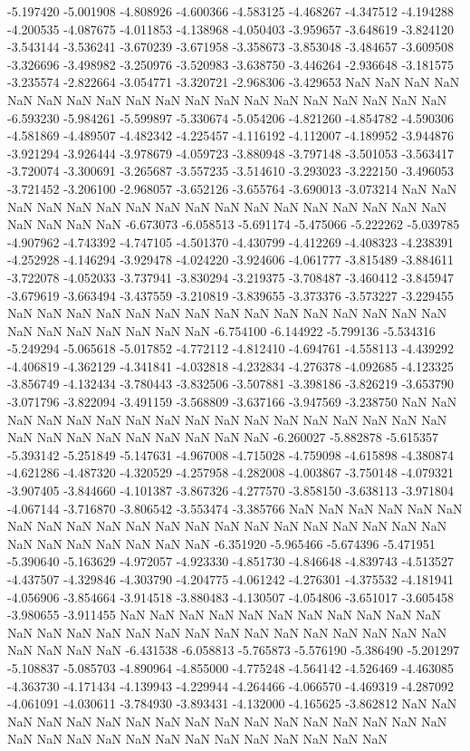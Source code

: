 -5.197420
-5.001908
-4.808926
-4.600366
-4.583125
-4.468267
-4.347512
-4.194288
-4.200535
-4.087675
-4.011853
-4.138968
-4.050403
-3.959657
-3.648619
-3.824120
-3.543144
-3.536241
-3.670239
-3.671958
-3.358673
-3.853048
-3.484657
-3.609508
-3.326696
-3.498982
-3.250976
-3.520983
-3.638750
-3.446264
-2.936648
-3.181575
-3.235574
-2.822664
-3.054771
-3.320721
-2.968306
-3.429653
NaN
NaN
NaN
NaN
NaN
NaN
NaN
NaN
NaN
NaN
NaN
NaN
NaN
NaN
NaN
NaN
NaN
NaN
NaN
-6.593230
-5.984261
-5.599897
-5.330674
-5.054206
-4.821260
-4.854782
-4.590306
-4.581869
-4.489507
-4.482342
-4.225457
-4.116192
-4.112007
-4.189952
-3.944876
-3.921294
-3.926444
-3.978679
-4.059723
-3.880948
-3.797148
-3.501053
-3.563417
-3.720074
-3.300691
-3.265687
-3.557235
-3.514610
-3.293023
-3.222150
-3.496053
-3.721452
-3.206100
-2.968057
-3.652126
-3.655764
-3.690013
-3.073214
NaN
NaN
NaN
NaN
NaN
NaN
NaN
NaN
NaN
NaN
NaN
NaN
NaN
NaN
NaN
NaN
NaN
NaN
NaN
NaN
NaN
-6.673073
-6.058513
-5.691174
-5.475066
-5.222262
-5.039785
-4.907962
-4.743392
-4.747105
-4.501370
-4.430799
-4.412269
-4.408323
-4.238391
-4.252928
-4.146294
-3.929478
-4.024220
-3.924606
-4.061777
-3.815489
-3.884611
-3.722078
-4.052033
-3.737941
-3.830294
-3.219375
-3.708487
-3.460412
-3.845947
-3.679619
-3.663494
-3.437559
-3.210819
-3.839655
-3.373376
-3.573227
-3.229455
NaN
NaN
NaN
NaN
NaN
NaN
NaN
NaN
NaN
NaN
NaN
NaN
NaN
NaN
NaN
NaN
NaN
NaN
NaN
NaN
NaN
NaN
-6.754100
-6.144922
-5.799136
-5.534316
-5.249294
-5.065618
-5.017852
-4.772112
-4.812410
-4.694761
-4.558113
-4.439292
-4.406819
-4.362129
-4.341841
-4.032818
-4.232834
-4.276378
-4.092685
-4.123325
-3.856749
-4.132434
-3.780443
-3.832506
-3.507881
-3.398186
-3.826219
-3.653790
-3.071796
-3.822094
-3.491159
-3.568809
-3.637166
-3.947569
-3.238750
NaN
NaN
NaN
NaN
NaN
NaN
NaN
NaN
NaN
NaN
NaN
NaN
NaN
NaN
NaN
NaN
NaN
NaN
NaN
NaN
NaN
NaN
NaN
NaN
NaN
NaN
-6.260027
-5.882878
-5.615357
-5.393142
-5.251849
-5.147631
-4.967008
-4.715028
-4.759098
-4.615898
-4.380874
-4.621286
-4.487320
-4.320529
-4.257958
-4.282008
-4.003867
-3.750148
-4.079321
-3.907405
-3.844660
-4.101387
-3.867326
-4.277570
-3.858150
-3.638113
-3.971804
-4.067144
-3.716870
-3.806542
-3.553474
-3.385766
NaN
NaN
NaN
NaN
NaN
NaN
NaN
NaN
NaN
NaN
NaN
NaN
NaN
NaN
NaN
NaN
NaN
NaN
NaN
NaN
NaN
NaN
NaN
NaN
NaN
NaN
NaN
NaN
-6.351920
-5.965466
-5.674396
-5.471951
-5.390640
-5.163629
-4.972057
-4.923330
-4.851730
-4.846648
-4.839743
-4.513527
-4.437507
-4.329846
-4.303790
-4.204775
-4.061242
-4.276301
-4.375532
-4.181941
-4.056906
-3.854664
-3.914518
-3.880483
-4.130507
-4.054806
-3.651017
-3.605458
-3.980655
-3.911455
NaN
NaN
NaN
NaN
NaN
NaN
NaN
NaN
NaN
NaN
NaN
NaN
NaN
NaN
NaN
NaN
NaN
NaN
NaN
NaN
NaN
NaN
NaN
NaN
NaN
NaN
NaN
NaN
NaN
NaN
-6.431538
-6.058813
-5.765873
-5.576190
-5.386490
-5.201297
-5.108837
-5.085703
-4.890964
-4.855000
-4.775248
-4.564142
-4.526469
-4.463085
-4.363730
-4.171434
-4.139943
-4.229944
-4.264466
-4.066570
-4.469319
-4.287092
-4.061091
-4.030611
-3.784930
-3.893431
-4.132000
-4.165625
-3.862812
NaN
NaN
NaN
NaN
NaN
NaN
NaN
NaN
NaN
NaN
NaN
NaN
NaN
NaN
NaN
NaN
NaN
NaN
NaN
NaN
NaN
NaN
NaN
NaN
NaN
NaN
NaN
NaN
NaN
NaN
